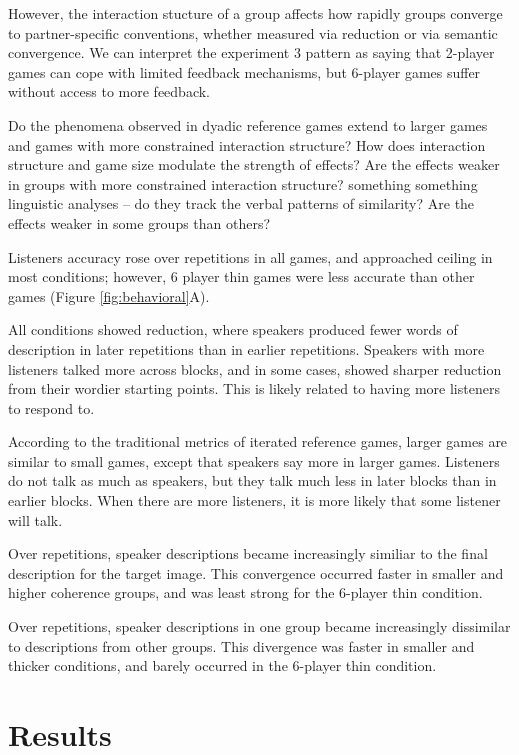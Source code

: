 \documentclass[
  english,
  a4paper,
]{article}
\begin{document}
However, the interaction stucture of a group affects how rapidly groups converge to partner-specific
conventions, whether measured via reduction or via semantic convergence.
We can interpret the experiment 3 pattern as saying that 2-player games can cope with limited feedback
mechanisms, but 6-player games suffer without access to more feedback.

Do the phenomena observed in dyadic reference games extend to larger games and games with more constrained interaction structure?
How does interaction structure and game size modulate the strength of effects? Are the effects weaker in groups with more constrained interaction structure?
something something linguistic analyses -- do they track the verbal patterns of similarity? Are the effects weaker in some groups than others?

Listeners accuracy rose over repetitions in all games, and approached ceiling in most conditions; however, 6 player thin games were less accurate than other games (Figure \ref{fig:behavioral}A).

All conditions showed reduction, where speakers produced fewer words of description in later repetitions than in earlier repetitions. Speakers with more listeners talked more across blocks, and in some cases, showed sharper reduction from their wordier starting points. This is likely related to having more listeners to respond to.

According to the traditional metrics of iterated reference games, larger games are similar to small games, except that speakers say more in larger games.
Listeners do not talk as much as speakers, but they talk much less in later blocks than in earlier blocks. When there are more listeners, it is more likely that some listener will talk.

Over repetitions, speaker descriptions became increasingly similiar to the final description for the target image. This convergence occurred faster in smaller and higher coherence groups, and was least strong for the 6-player thin condition.

Over repetitions, speaker descriptions in one group became increasingly dissimilar to descriptions from other groups. This divergence was faster in smaller and thicker conditions, and barely occurred in the 6-player thin condition.

\hypertarget{results}{%
\section{Results}\label{results}}
\end{document}
